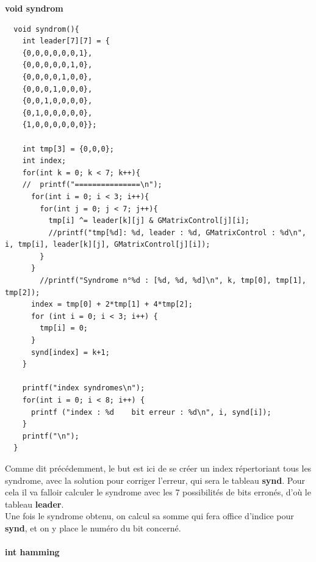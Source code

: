 \documentclass[12pt]{article}
\begin{document}
\textbf{void syndrom}
\\
\begin{verbatim}
  void syndrom(){
    int leader[7][7] = {
    {0,0,0,0,0,0,1},
    {0,0,0,0,0,1,0},
    {0,0,0,0,1,0,0},
    {0,0,0,1,0,0,0},
    {0,0,1,0,0,0,0},
    {0,1,0,0,0,0,0},
    {1,0,0,0,0,0,0}};

    int tmp[3] = {0,0,0};
    int index;
    for(int k = 0; k < 7; k++){
    //  printf("===============\n");
      for(int i = 0; i < 3; i++){
        for(int j = 0; j < 7; j++){
          tmp[i] ^= leader[k][j] & GMatrixControl[j][i];
          //printf("tmp[%d]: %d, leader : %d, GMatrixControl : %d\n", i, tmp[i], leader[k][j], GMatrixControl[j][i]);
        }
      }
        //printf("Syndrome n°%d : [%d, %d, %d]\n", k, tmp[0], tmp[1], tmp[2]);
      index = tmp[0] + 2*tmp[1] + 4*tmp[2];
      for (int i = 0; i < 3; i++) {
        tmp[i] = 0;
      }
      synd[index] = k+1;
    }

    printf("index syndromes\n");
    for(int i = 0; i < 8; i++) {
      printf ("index : %d    bit erreur : %d\n", i, synd[i]);
    }
    printf("\n");
  }
\end{verbatim}
Comme dit précédemment, le but est ici de se créer un index répertoriant tous les syndrome, avec la solution pour corriger l’erreur, qui sera le tableau \textbf{synd}. Pour cela il va falloir calculer le syndrome avec les 7 possibilités de bits erronés, d’où le tableau \textbf{leader}.\\
Une fois le syndrome obtenu, on calcul sa somme qui fera office d’indice pour \textbf{synd}, et on y place le numéro du bit concerné.
\\
\\\textbf{int hamming}
\\
\end{document}
